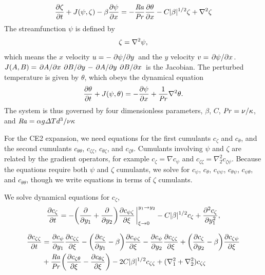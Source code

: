 \documentclass{jfm}
\newcommand{\cz}{c_{\zeta}}
\newcommand{\cs}{c_{\psi}}
\newcommand{\ct}{c_{\theta}}
\newcommand{\css}{c_{\psi \psi}}
\newcommand{\csz}{c_{\psi \zeta}}
\newcommand{\czs}{c_{\zeta \psi}}
\newcommand{\czz}{c_{\zeta \zeta}}
\newcommand{\ctz}{c_{\theta \zeta}}
\newcommand{\czt}{c_{\zeta \theta}}
\newcommand{\ctt}{c_{\theta \theta}}
\newcommand{\cst}{c_{\psi \theta}}
\newcommand{\cts}{c_{\theta \psi}}
\newcommand{\Ray}{\mbox{\textit{Ra}}}  %
\begin{document}
\begin{equation}
  \label{eq:zeta_eom}
  \pdv{\zeta}{t} + J(\psi, \zeta) - \beta \pdv{\psi}{x} = -\frac{\Ray}{\Pran} \pdv{\theta}{x} -C |\beta|^{1/2} \zeta + \laplacian{\zeta}
\end{equation}
The streamfunction $\psi$ is defined by
\begin{equation}
  \label{eq:zeta_def}
  \zeta = \laplacian{\psi},
\end{equation}
which means the $x$ velocity $u = -\pdv*{\psi}{y}$ and the $y$ velocity $v = \pdv*{\psi}{x}$. $J(A, B) = \pdv*{A}{x}\pdv*{B}{y} - \pdv*{A}{y}\pdv*{B}{x}$ is the Jacobian. 
The perturbed temperature is given by $\theta$, which obeys the dynamical equation
%
\begin{equation}
  \label{eq:theta}
  \pdv{\theta}{t} + J(\psi, \theta) = -\pdv{\psi}{x} + \frac{1}{\mbox{\textit{Pr}}} \nabla^2 \theta.
\end{equation}
The system is thus governed by four dimensionless parameters, $\beta$, $C$, $\mbox{\textit{Pr}} = \nu/
\kappa$, and $\Ray = \alpha g \Delta T d^3/\nu \kappa$

For the CE2 expansion, we need equations for the first cumulants $\cz$ and $\ct$, and the second cumulants $\ctt$, $\czz$, $\ctz$, and $\czt$. 
Cumulants involving $\psi$ and $\zeta$ are related by the gradient operators, for example $\cz = \nabla \cs$ and $\czz = \nabla_2^2 \czs$.
Because the equations require both $\psi$ and $\zeta$ cumulants, we solve for $\cs$, $\ct$, $\css$, $\cts$, $\cst$, and $\ctt$, though we write equations in terms of $\zeta$ cumulants.

We solve dynamical equations for $\cz$,
\begin{equation}
  \label{eq:cz}
  \pdv{\cz}{t} = - \qty(\pdv{y_1} + \pdv{y_2}) \pdv{\csz}{\xi}\eval_{\xi \to 0}^{y_1 \to y_2} - C |\beta|^{1/2} \cz + \pdv[2]{\cz}{y_1},
\end{equation}

\begin{equation}
  \label{eq:czz}
  \begin{split}
    \pdv{\czz}{t} &= \pdv{\cs}{y_1} \pdv{\czz}{\xi} - \qty(\pdv{\cz}{y_1} - \beta) \pdv{\csz}{\xi} - \pdv{\cs}{y_2} \pdv{\czz}{\xi}  + \qty(\pdv{\cz}{y_2} - \beta) \pdv{\czs}{\xi}\\
    &+ \frac{\Ray}{\Pran} \qty(\pdv{\czt}{\xi} -  \pdv{\ctz}{\xi}) - 2C |\beta|^{1/2} \czz + (\nabla_1^2 + \nabla_2^2) \czz    
  \end{split}
\end{equation}
\end{document}
